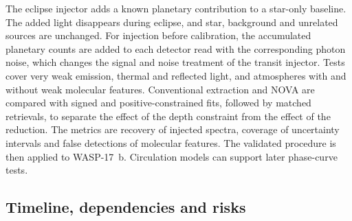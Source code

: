 The eclipse injector adds a known planetary contribution to a star-only
baseline. The added light disappears during eclipse, and star, background
and unrelated sources are unchanged. For injection before calibration,
the accumulated planetary counts are added to each detector read with the
corresponding photon noise, which changes the signal and noise treatment
of the transit injector. Tests cover very weak emission, thermal and
reflected light, and atmospheres with and without weak molecular
features. Conventional extraction and NOVA are compared with signed and
positive-constrained fits, followed by matched retrievals, to separate
the effect of the depth constraint from the effect of the reduction. The
metrics are recovery of injected spectra, coverage of uncertainty
intervals and false detections of molecular features. The validated
procedure is then applied to WASP-17~b. Circulation models can support
later phase-curve tests.

\subsection{Timeline, dependencies and risks}
\label{subsec:fw_timeline}


